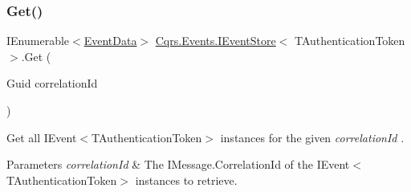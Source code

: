 \mbox{\label{interfaceCqrs_1_1Events_1_1IEventStore_af398bb6768fa661ad97a9fa9ecfbd9fb_af398bb6768fa661ad97a9fa9ecfbd9fb}} 
\subsubsection{\texorpdfstring{Get()}{Get()}\hspace{0.1cm}{\footnotesize\ttfamily [2/2]}}
{\footnotesize\ttfamily I\+Enumerable$<$\hyperlink{classCqrs_1_1Events_1_1EventData}{Event\+Data}$>$ \hyperlink{interfaceCqrs_1_1Events_1_1IEventStore}{Cqrs.\+Events.\+I\+Event\+Store}$<$ T\+Authentication\+Token $>$.Get (\begin{DoxyParamCaption}\item[{Guid}]{correlation\+Id }\end{DoxyParamCaption})}



Get all I\+Event$<$\+T\+Authentication\+Token$>$ instances for the given {\itshape correlation\+Id} . 


\begin{DoxyParams}{Parameters}
{\em correlation\+Id} & The I\+Message.\+Correlation\+Id of the I\+Event$<$\+T\+Authentication\+Token$>$ instances to retrieve.\\
\hline
\end{DoxyParams}


